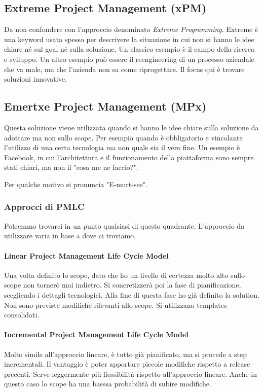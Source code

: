 \subsection{Extreme Project Management (xPM)}
Da non confondere con l'approccio denominato \textit{Extreme Programming}. Extreme è una keyword usata spesso per descrivere la situazione in cui non si hanno le idee chiare né sul goal né sulla soluzione. Un classico esempio è il campo della ricerca e sviluppo. Un altro esempio può essere il reengineering di un processo aziendale che va male, ma che l'azienda non sa come riprogettare. Il focus qui è trovare soluzioni innovative.
\subsection{Emertxe Project Management (MPx)}
Questa soluzione viene utilizzata quando si hanno le idee chiare sulla soluzione da adottare ma non sullo scope. Per esempio quando è obbligatorio e vincolante l'utilizzo di una certa tecnologia ma non quale sia il vero fine. Un esempio è Facebook, in cui l'architettura e il funzionamento della piattaforma sono sempre stati chiari, ma non il "cosa me ne faccio?".
\begin{info}
	Per qualche motivo si pronuncia "E-murt-see".
\end{info}
\subsubsection{Approcci di PMLC}
Potremmo trovarci in un punto qualsiasi di questo quadrante. L'approccio da utilizzare varia in base a dove ci troviamo.
\paragraph{Linear Project Management Life Cycle Model}
Una volta definito lo scope, dato che ho un livello di certezza molto alto sullo scope non tornerò mai indietro. Si concretizzerà poi la fase di pianificazione, scegliendo i dettagli tecnologici. Alla fine di questa fase ho già definito la solution. Non sono previste modifiche rilevanti allo scope. Si utilizzano templates consolidati.
\paragraph{Incremental Project Management Life Cycle Model}
Molto simile all'approccio lineare, è tutto già pianificato, ma si procede a step incrementali. Il vantaggio è poter apportare piccole modifiche rispetto a release precenti. Serve leggermente più flessibilità rispetto all'approccio lineare. Anche in questo caso lo scope ha una basssa probabilità di subire modifiche.
